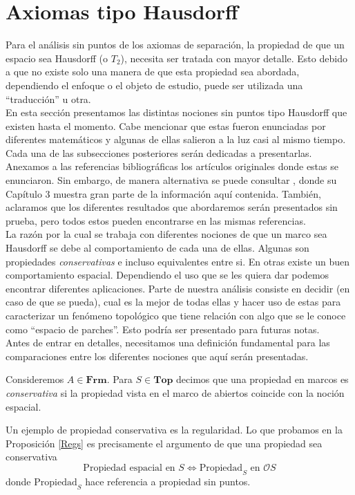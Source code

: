 \documentclass{comunicaciones}
\begin{document}
\section{Axiomas tipo Hausdorff}

Para el análisis sin puntos de los axiomas de separación, la propiedad de que un espacio sea Hausdorff (o $T_2$), necesita ser tratada con mayor detalle. Esto debido a que no existe solo una manera de que esta propiedad sea abordada, dependiendo el enfoque o el objeto de estudio, puede ser utilizada una ``traducción'' u otra.\\

En esta sección presentamos las distintas nociones sin puntos tipo Hausdorff que existen hasta el momento. Cabe mencionar que estas fueron enunciadas por diferentes matemáticos y algunas de ellas salieron a la luz casi al mismo tiempo. Cada una de las subsecciones posteriores serán dedicadas a presentarlas. Anexamos a las referencias bibliográficas los artículos originales donde estas se enunciaron. Sin embargo, de manera alternativa se puede consultar \cite{J.P.2}, donde su Capítulo 3 muestra gran parte de la información aquí contenida. También, aclaramos que los diferentes resultados que abordaremos serán presentados sin prueba, pero todos estos pueden encontrarse en las mismas referencias.\\

La razón por la cual se trabaja con diferentes nociones de que un marco sea Hausdorff se debe al comportamiento de cada una de ellas. Algunas son propiedades \emph{conservativas} e incluso equivalentes entre si. En otras existe un buen comportamiento espacial. Dependiendo el uso que se les quiera dar podemos encontrar diferentes aplicaciones. Parte de nuestra análisis consiste en decidir (en caso de que se pueda), cual es la mejor de todas ellas y hacer uso de estas para caracterizar un fenómeno topológico que tiene relación con algo que se le conoce como ``espacio de parches''. Esto podría ser presentado para futuras notas.\\

Antes de entrar en detalles, necesitamos una definición fundamental para las comparaciones entre los diferentes nociones que aquí serán presentadas.

\begin{dfn}\label{Pconservativa}
    Consideremos $A\in \mathbf{Frm}$. Para $S\in \mathbf{Top}$ decimos que una propiedad en marcos es \emph{conservativa} si la propiedad vista en el marco de abiertos coincide con la noción espacial.
\end{dfn}
 Un ejemplo de propiedad conservativa es la regularidad. Lo que probamos en la Proposición \ref{Regs} es precisamente el argumento de que una propiedad sea conservativa
 \[
 \mbox{Propiedad espacial en } S\Leftrightarrow \mbox{Propiedad}_S \mbox{ en }\mathcal{O}S
 \]
 donde $\mbox{Propiedad}_S$ hace referencia a propiedad sin puntos.
\end{document}

